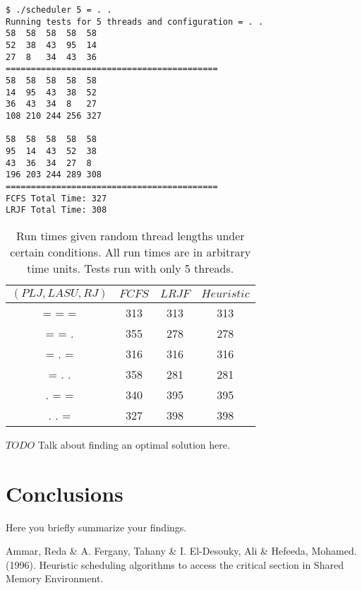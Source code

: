 \documentclass[letterpaper,12pt]{article}
\begin{document}
\begin{verbatim}
$ ./scheduler 5 = . .
Running tests for 5 threads and configuration = . .
58	58	58	58	58	
52	38	43	95	14	
27	8	34	43	36	
==========================================
58	58	58	58	58	
14	95	43	38	52	
36	43	34	8	27	
108	210	244	256	327	

58	58	58	58	58	
95	14	43	52	38	
43	36	34	27	8	
196	203	244	289	308
==========================================
FCFS Total Time: 327
LRJF Total Time: 308
\end{verbatim}

\begin{table}[ht]
\begin{center}
\caption{Run times given random thread lengths under certain conditions. All run times are in arbitrary time units. Tests run with only 5 threads.}
\begin{tabular}{|c|ccc|} 
\hline
\multicolumn{1}{|c|}{$(PLJ, LASU, RJ)$} &
\multicolumn{1}{c}{$FCFS$} &
\multicolumn{1}{c}{$LRJF$} &
\multicolumn{1}{c|}{$Heuristic$} \\
\hline
= = = & 313 & 313 & 313 \\
= = .  & 355 & 278 & 278 \\
= . = & 316 & 316 & 316 \\
= . . & 358 & 281 & 281 \\
. = = & 340 & 395 & 395 \\
. . = & 327 & 398 & 398 \\
\hline
\end{tabular}
\end{center}
\end{table}

$TODO$ Talk about finding an optimal solution here.  


\section{Conclusions}
Here you briefly summarize your findings.


\begin{thebibliography}{99}

Ammar, Reda \& A. Fergany, Tahany \& I. El-Desouky, Ali \& Hefeeda, Mohamed. (1996). Heuristic scheduling algorithms to access the critical section in Shared Memory Environment. 

\end{thebibliography}
\end{document}
